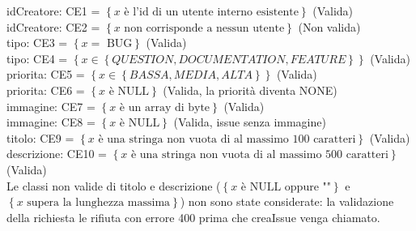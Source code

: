 \noindent idCreatore: CE1 = $\left\{ x \text{ è l'id di un utente interno esistente} \right\}$ (Valida) \\
idCreatore: CE2 = $\left\{ x \text{ non corrisponde a nessun utente} \right\}$  (Non valida) \\
tipo: CE3 = $\left\{ x = \text{ BUG} \right\}$ (Valida) \\
tipo: CE4 = $\left\{ x \in \left\{ QUESTION, DOCUMENTATION, FEATURE \right\} \right\}$ (Valida) \\
priorita: CE5 =  $\left\{ x \in \left\{ BASSA, MEDIA, ALTA \right\} \right\}$ (Valida) \\
priorita: CE6 = $\left\{ x \text{ è NULL} \right\}$ (Valida, la priorità diventa NONE) \\
immagine: CE7 =  $\left\{ x \text{ è un array di byte} \right\}$ (Valida) \\
immagine: CE8 = $\left\{ x \text{ è NULL} \right\}$ (Valida, issue senza immagine) \\
titolo: CE9 = $\left\{ x \text{ è una stringa non vuota di al massimo 100 caratteri} \right\}$ (Valida) \\
descrizione: CE10 = $\left\{ x \text{ è una stringa non vuota di al massimo 500 caratteri} \right\}$ (Valida) \\

\noindent Le classi non valide di titolo e descrizione ($\left\{ x \text{ è NULL oppure ""} \right\}$ e \\
$\left\{ x \text{ supera la lunghezza massima} \right\}$) non 
sono state considerate: la validazione della richiesta le rifiuta con errore 400 prima che creaIssue venga chiamato.  

